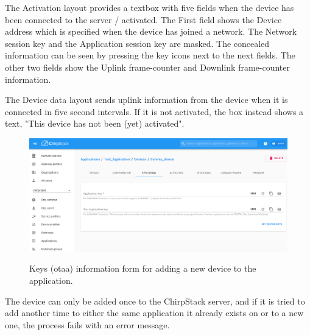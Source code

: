 The Activation layout provides a textbox with five fields when the device has been connected to the server / activated.
The First field shows the Device address which is specified when the device has joined a network.
The Network session key and the Application session key are masked.
The concealed information can be seen by pressing the key icons next to the next fields.
The other two fields show the Uplink frame-counter and Downlink frame-counter information.

The Device data layout sends uplink information from the device when it is connected in five second intervals.
If it is not activated, the box instead shows a text, "This device has not been (yet) activated".

\clearpage

\begin{figure}[ht]
  \centering
  {\includegraphics[width=\textwidth]{illustration/ChirpStack_new_device_2.png}}
  \caption{Keys (\gls{otaa}) information form for adding a new device to the application.}
  \label{fig:ChirpStack_new_device_2}
\end{figure}

The device can only be added once to the ChirpStack server, and if it is tried to add another time to either the same application it already exists on or to a new one, the process fails with an error message.


\clearpage %
